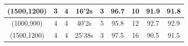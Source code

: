 \begin{table}[H]
\begin{tabular}{@{}ccccccccc@{}}
\multicolumn{1}{c|}{(1500,1200)}                        & \multicolumn{1}{c}{3}                  & 4                     & \multicolumn{1}{c|}{16'2s}                    & 3   & \multicolumn{1}{c|}{96.7} & 10  & \multicolumn{1}{c|}{91.9} & 91.8   \\ \midrule
\multicolumn{1}{c|}{(1000,900)}                         & \multicolumn{1}{c}{4}                  & 4                     & \multicolumn{1}{c|}{40'2s}                    & 5   & \multicolumn{1}{c|}{95.8} & 12  & \multicolumn{1}{c|}{92.7} & 92.9   \\
\multicolumn{1}{c|}{(1500,1200)}                        & \multicolumn{1}{c}{4}                  & 4                     & \multicolumn{1}{c|}{25'38s}                   & 3   & \multicolumn{1}{c|}{97.5} & 16  & \multicolumn{1}{c|}{90.5} & 91.5   \\ \bottomrule
\end{tabular}
\label{hetero_tab_time_10}
\end{table}

